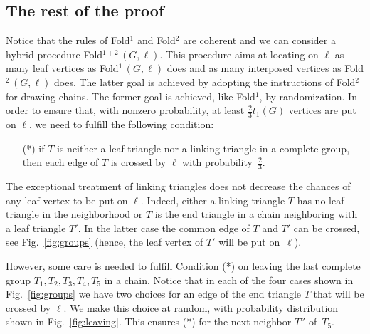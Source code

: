 \documentclass[reqno,12pt]{amsart}
\newcommand{\foldn}[1]{{\sc Fold}$^{#1}$}
\newcommand{\fold}[2]{{\sc Fold}$^{#1}\,(#2)$}
\begin{document}
\subsection{The rest of the proof}

Notice that the rules of \foldn1 and \foldn2 are coherent
and we can consider a hybrid procedure \fold{1+2}{G,\ell}.
This procedure aims at locating on $\ell$ as many leaf vertices
as \fold{1}{G,\ell} does and as many interposed vertices as
\fold{2}{G,\ell} does.
The latter goal is achieved by adopting the instructions of \foldn2
for drawing chains. The former goal is achieved, like \foldn1, 
by randomization. In order to ensure that, with nonzero probability,
at least $\frac23t_1(G)$ vertices are put on $\ell$,
we need to fulfill the following condition:
\begin{enumerate}
\item[(*)]
if $T$ is neither a leaf triangle nor a linking triangle in a complete group, then
each edge of $T$ is crossed by $\ell$ with probability~$\frac23$.
\end{enumerate}
The exceptional treatment of linking triangles
does not decrease the chances of any leaf vertex to be put on $\ell$.
Indeed, either a linking triangle $T$ has no leaf triangle in the neighborhood or
$T$ is the end triangle in a chain neighboring with a leaf triangle $T'$.
In the latter case the common edge of $T$ and $T'$ can be crossed, see Fig.~\ref{fig:groups}
(hence, the leaf vertex of $T'$ will be put on~$\ell$).

However, some care is needed to fulfill Condition (*)
on leaving the last complete group $T_1,T_2,T_3,T_4,T_5$ in a chain. Notice that
in each of the four cases shown in Fig.~\ref{fig:groups} we have two choices for an edge of the
end triangle $T$ that will be crossed by $\ell$. We make this choice
at random, with probability distribution shown in Fig.~\ref{fig:leaving}.
This ensures (*) for the next neighbor $T''$ of~$T_5$.
\end{document}
